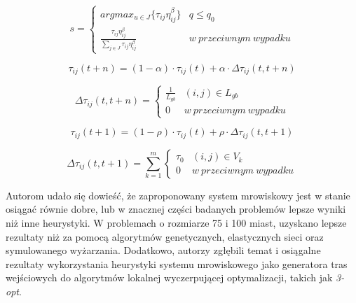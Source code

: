 {{{            \begin{equation}\label{eqt:ant_colony_dispatch}
                s = \left\{
                        \begin{matrix}
                            argmax_{u \in J} \{\tau_{ij}\eta_{ij}^\beta\} & q \leq q_0\\
                            \frac{\tau_{ij} \eta_{ij}^\beta}{\sum_{j\in J} {\tau_{ij} \eta_{ij}^\beta} } & w\ przeciwnym\ wypadku
                        \end{matrix}
                    \right.
            \end{equation}

            \begin{equation}\label{eqt:ant_colony_global_update_1}
                \tau_{ij}(t + n) = (1 - \alpha) \cdot \tau_{ij}(t) + \alpha \cdot \Delta\tau_{ij}(t, t + n)
            \end{equation}

            \begin{equation}\label{eqt:ant_colony_global_update_2}
                \Delta\tau_{ij}(t, t + n) = \left\{
                    \begin{matrix}
                        \frac{1}{L_{gb}} & (i, j) \in L_{gb} \\
                        0 & w\ przeciwnym\ wypadku
                    \end{matrix}
                \right.
            \end{equation}

            \begin{equation}\label{eqt:ant_colony_local_update_1}
                \tau_{ij}(t + 1) = (1 - \rho) \cdot \tau_{ij}(t) + \rho \cdot \Delta\tau_{ij}(t, t + 1)
            \end{equation}

            \begin{equation}\label{eqt:ant_colony_local_update_2}
                \Delta\tau_{ij}(t, t + 1) = \sum_{k=1}^m \left\{
                    \begin{matrix}
                        \tau_0 & (i, j) \in V_k \\
                        0 & w\ przeciwnym\ wypadku
                    \end{matrix}
                \right.
            \end{equation}

            Autorom udało się dowieść, że zaproponowany system mrowiskowy jest w stanie osiągać równie dobre, lub w
            znacznej części badanych problemów lepsze wyniki niż inne heurystyki. W problemach o
            rozmiarze 75 i 100 miast, uzyskano lepsze rezultaty niż za pomocą algorytmów genetycznych, elastycznych
            sieci oraz symulowanego wyżarzania. Dodatkowo, autorzy zgłębili temat i osiągalne rezultaty wykorzystania
            heurystyki systemu mrowiskowego jako generatora tras wejściowych do algorytmów lokalnej wyczerpującej
            optymalizacji, takich jak \textit{3-opt}.
        }

}}
